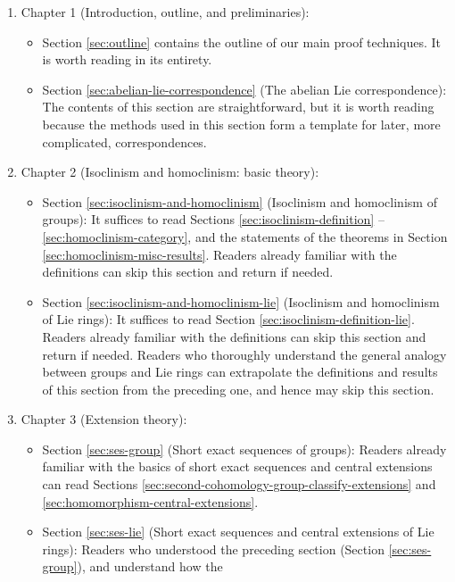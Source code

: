 \begin{enumerate}
\item Chapter 1 (Introduction, outline, and preliminaries):
  \begin{itemize}
  \item Section \ref{sec:outline} contains the outline of our main
    proof techniques. It is worth reading in its entirety.
  \item Section \ref{sec:abelian-lie-correspondence} (The abelian Lie
    correspondence): The contents of this section are straightforward,
    but it is worth reading because the methods used in this section
    form a template for later, more complicated, correspondences.
    \end{itemize}
\item Chapter 2 (Isoclinism and homoclinism: basic theory):
  \begin{itemize}
  \item Section \ref{sec:isoclinism-and-homoclinism} (Isoclinism and
    homoclinism of groups): It suffices to read Sections
    \ref{sec:isoclinism-definition} -- \ref{sec:homoclinism-category}, and
    the statements of the theorems in Section
    \ref{sec:homoclinism-misc-results}. Readers already familiar with
    the definitions can skip this section and return if needed.
  \item Section \ref{sec:isoclinism-and-homoclinism-lie} (Isoclinism
    and homoclinism of Lie rings): It suffices to read Section
    \ref{sec:isoclinism-definition-lie}. Readers already familiar with
    the definitions can skip this section and return if
    needed. Readers who thoroughly understand the general analogy
    between groups and Lie rings can extrapolate the definitions and
    results of this section from the preceding one, and hence may skip
    this section.
  \end{itemize}
\item Chapter 3 (Extension theory):
  \begin{itemize}
  \item Section \ref{sec:ses-group} (Short exact sequences of groups):
    Readers already familiar with the basics of short exact sequences
    and central extensions can read Sections
    \ref{sec:second-cohomology-group-classify-extensions} and
    \ref{sec:homomorphism-central-extensions}.
  \item Section \ref{sec:ses-lie} (Short exact sequences and central
    extensions of Lie rings): Readers who understood the preceding
    section (Section \ref{sec:ses-group}), and understand how the

\end{itemize}
\end{enumerate}
